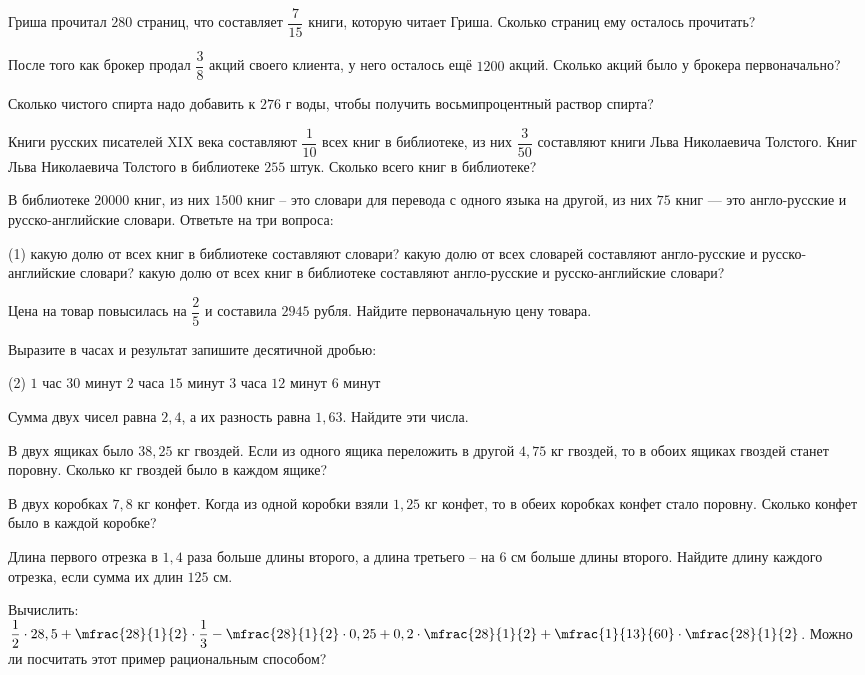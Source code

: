 %
%
\begin{class}[number=5]
	\begin{listofex}
		\item Гриша прочитал \(280\) страниц, что составляет \(\dfrac{7}{15}\) книги, которую читает Гриша. Сколько страниц ему осталось прочитать?
		\item После того как брокер продал \( \dfrac{3}{8} \) акций своего клиента, у него осталось ещё \(1200\) акций. Сколько акций было у брокера первоначально?
		\item Сколько чистого спирта надо добавить к \(276\) г воды, чтобы получить восьмипроцентный раствор спирта?
		\item Книги русских писателей XIX века составляют \(\dfrac{1}{10}\) всех книг в библиотеке, из них \(\dfrac{3}{50}\) составляют книги Льва Николаевича Толстого. Книг Льва Николаевича Толстого в библиотеке \(255\) штук. Сколько всего книг в библиотеке?
		\item В библиотеке \(20000\) книг, из них \(1500\) книг – это словари для перевода с одного языка на другой, из них \(75\) книг --- это англо-русские и русско-английские словари. Ответьте на три вопроса:
		\begin{tasks}(1)
			\task какую долю от всех книг в библиотеке составляют словари?
			\task какую долю от всех словарей составляют англо-русские и русско-английские словари?
			\task какую долю от всех книг в библиотеке составляют англо-русские и русско-английские словари?
		\end{tasks}
		\item Цена на товар повысилась на \(\dfrac{2}{5}\) и составила \(2945\) рубля. Найдите первоначальную цену товара.
		\item Выразите в часах и результат запишите десятичной дробью:
		\begin{tasks}(2)
			\task \(1\) час \(30\) минут
			\task \(2\) часа \(15\) минут
			\task \(3\) часа \(12\) минут
			\task \(6\) минут
		\end{tasks}
		\item Сумма двух чисел равна \(2,4\), а их разность равна \(1,63\). Найдите эти числа.
		\item В двух ящиках было \(38,25\) кг гвоздей. Если из одного ящика переложить в другой \(4,75\) кг гвоздей, то в обоих ящиках гвоздей станет поровну. Сколько кг гвоздей было в каждом ящике?
		\item В двух коробках \(7,8\) кг конфет. Когда из одной коробки взяли \(1,25\) кг конфет, то в обеих коробках конфет стало поровну. Сколько конфет было в каждой коробке?
		
		\item Длина первого отрезка в \(1,4\) раза больше длины второго, а длина третьего – на \(6\) см больше длины второго. Найдите длину каждого отрезка, если сумма их длин \(125\) см.
		\item Вычислить: \(\dfrac{1}{2} \cdot 28,5 + \mfrac{28}{1}{2} \cdot \dfrac{1}{3} - \mfrac{28}{1}{2} \cdot 0,25 + 0,2 \cdot \mfrac{28}{1}{2} + \mfrac{1}{13}{60} \cdot \mfrac{28}{1}{2}\). Можно ли посчитать этот пример рациональным способом?
	\end{listofex}
\end{class}
